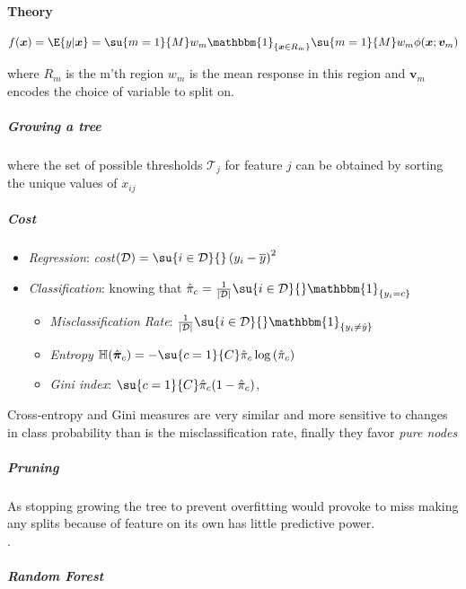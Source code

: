 \paragraph{Theory}
\begin{center}
    $f(\bm{x}) = \E{y|\bm{x}} = \su{m=1}{M}w_{m}\mathbbm{1}_{\{\bm{x}\in R_{m}\}}
\su{m=1}{M}w_{m}\phi(\bm{x};\bm{v}_{m})$
\end{center}
where $R_{m}$ is the m'th region $w_{m}$ is the mean response in this region and 
$\bm{v}_{m}$ encodes the choice of variable to split on.
\subparagraph{Growing a tree}
\begin{center}
\end{center}
where the set of possible thresholds $\mathcal{T}_{j}$ for feature $j$ can be obtained
by sorting the unique values of $x_{ij}$
\subparagraph{Cost}
\begin{itemize}
    \item \emph{Regression}: \emph{cost}$(\mathcal{D})=\su{i\in\mathcal{D}}{}\left(
        y_{i}-\overline{y}\right)^{2}$
    \item \emph{Classification}:  knowing that $\hat{\pi}_{c} = \frac{1}{|\mathcal{D}|}
        \su{i\in\mathcal{D}}{}\mathbbm{1}_{\{y_{i}=c\}}$ 
        \begin{itemize}
            \item \emph{Misclassification Rate}: $\frac{1}{|\mathcal{D}|}\su{i\in
                \mathcal{D}}{}\mathbbm{1}_{\{y_{i}\neq\hat{y}\}}$
            \item \emph{Entropy} $\mathbb{H}(\hat{\bm{\pi}}_{c}) =-\su{c=1}{C}\hat{\pi}
                _{c}\log\left(\hat{\pi}_{c}\right)$
            \item \emph{Gini index}: $\su{c=1}{C}\hat{\pi}_{c} (1-\hat{\pi}_{c})$, 
        \end{itemize}
\end{itemize}
Cross-entropy and Gini measures are very similar and more sensitive to changes in class
probability than is the misclassification rate, finally they favor \emph{pure nodes}
\subparagraph{Pruning}
As stopping growing the tree to prevent overfitting would provoke to miss making any
splits because of feature on its own has little predictive power.\\
.
\subparagraph{Random Forest}

